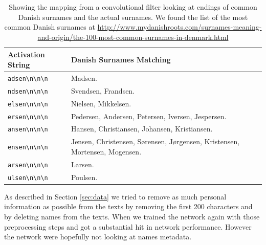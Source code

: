 \begin{table}
    \begin{tabular}{ll}
        \textbf{Activation String} & \textbf{Danish Surnames Matching} \\
        \hline
        \verb!adsen\n\n\n! & Madsen. \\
        \verb!ndsen\n\n\n! & Svendsen, Frandsen. \\
        \verb!elsen\n\n\n! & Nielsen, Mikkelsen. \\
        \verb!ersen\n\n\n! & Pedersen, Andersen, Petersen, Iversen, Jespersen. \\
        \verb!ansen\n\n\n! & Hansen, Christiansen, Johansen, Kristiansen. \\
        \verb!ensen\n\n\n! & Jensen, Christensen, S\o rensen, J\o rgensen, Kristensen,
                             Mortensen, Mogensen. \\
        \verb!arsen\n\n\n! & Larsen. \\
        \verb!ulsen\n\n\n! & Poulsen.
    \end{tabular}
    \caption{Showing the mapping from a convolutional filter looking at endings
        of common Danish surnames and the actual surnames. We found the list of
        the most common Danish surnames at
        \url{http://www.mydanishroots.com/surnames-meaning-and-origin/the-100-most-common-surnames-in-denmark.html}}
    \label{tab:name_features}
\end{table}

As described in Section \ref{sec:data} we tried to remove as much personal
information as possible from the texts by removing the first 200 characters
and by deleting names from the texts. When we trained the network again with
those preprocessing steps and got a substantial hit in network performance.
However the network were hopefully not looking at names metadata.



